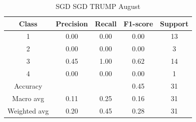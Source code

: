 \begin{enumerate}
\begin{enumerate}
\begin{table}[H]
                \vspace{1em}
                
                \scriptsize
                \begin{tabular}{c|cccc}
                \hline
                Class & Precision & Recall & F1-score & Support \\
                \hline
                1 & 0.00 & 0.00 & 0.00 & 13 \\
                2 & 0.00 & 0.00 & 0.00 & 3 \\
                3 & 0.45 & 1.00 & 0.62 & 14 \\
                4 & 0.00 & 0.00 & 0.00 & 1 \\
                \hline
                Accuracy &       &      & 0.45 & 31 \\
                Macro avg & 0.11 & 0.25 & 0.16 & 31 \\
                Weighted avg & 0.20 & 0.45 & 0.28 & 31 \\
                \hline
                \end{tabular}
                \caption{SGD SGD TRUMP August}
                \label{tab:classifier_2_report_sgd_sgd_trump_non_filtered_aug}
                \end{table}



                
    
    
                
            \end{enumerate}
            
    \end{enumerate}

    \pagebreak







